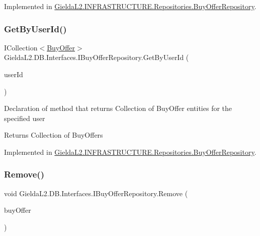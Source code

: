 Implemented in \mbox{\hyperlink{class_gielda_l2_1_1_i_n_f_r_a_s_t_r_u_c_t_u_r_e_1_1_repositories_1_1_buy_offer_repository_adf2f5395c33786befc29d371aecee31d}{Gielda\+L2.\+I\+N\+F\+R\+A\+S\+T\+R\+U\+C\+T\+U\+R\+E.\+Repositories.\+Buy\+Offer\+Repository}}.

\mbox{\label{interface_gielda_l2_1_1_d_b_1_1_interfaces_1_1_i_buy_offer_repository_a65cd54e2405e6121a0e1d7bb91184337}} 
\subsubsection{\texorpdfstring{GetByUserId()}{GetByUserId()}}
{\footnotesize\ttfamily I\+Collection$<$\mbox{\hyperlink{class_gielda_l2_1_1_d_b_1_1_entities_1_1_buy_offer}{Buy\+Offer}}$>$ Gielda\+L2.\+D\+B.\+Interfaces.\+I\+Buy\+Offer\+Repository.\+Get\+By\+User\+Id (\begin{DoxyParamCaption}\item[{int}]{user\+Id }\end{DoxyParamCaption})}



Declaration of method that returns Collection of Buy\+Offer entities for the specified user 

\begin{DoxyReturn}{Returns}
Collection of Buy\+Offers
\end{DoxyReturn}


Implemented in \mbox{\hyperlink{class_gielda_l2_1_1_i_n_f_r_a_s_t_r_u_c_t_u_r_e_1_1_repositories_1_1_buy_offer_repository_a068d5dc2abf5a84ebd32a5cc6d2d835b}{Gielda\+L2.\+I\+N\+F\+R\+A\+S\+T\+R\+U\+C\+T\+U\+R\+E.\+Repositories.\+Buy\+Offer\+Repository}}.

\mbox{\label{interface_gielda_l2_1_1_d_b_1_1_interfaces_1_1_i_buy_offer_repository_af9d25dfd52c71cc21dd7a89bf54f2ee4}} 
\subsubsection{\texorpdfstring{Remove()}{Remove()}}
{\footnotesize\ttfamily void Gielda\+L2.\+D\+B.\+Interfaces.\+I\+Buy\+Offer\+Repository.\+Remove (\begin{DoxyParamCaption}\item[{\mbox{\hyperlink{class_gielda_l2_1_1_d_b_1_1_entities_1_1_buy_offer}{Buy\+Offer}}}]{buy\+Offer }\end{DoxyParamCaption})}



